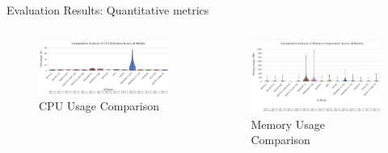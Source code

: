 \documentclass{beamer}
\begin{document}
\begin{frame}{Evaluation Results: Quantitative metrics}
  \begin{columns}[t]
      \begin{figure}
        \centering
        \includegraphics[width=0.9\columnwidth]{model_cpu_usage_comparison.png}
        \caption{CPU Usage Comparison}
        \label{fig:cpu-usage}
      \end{figure}
      \begin{figure}
        \centering
        \includegraphics[width=0.9\columnwidth]{model_memory_usage_comparison.png}
        \caption{Memory Usage Comparison}
        \label{fig:memory-usage}
      \end{figure}
  \end{columns}
\end{frame}


\begin{frame}
  \maketitle
\end{frame}
\end{document}
